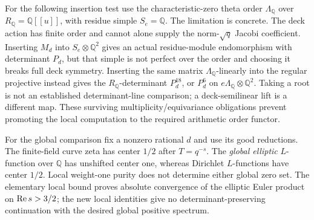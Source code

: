 For the following insertion test use the characteristic-zero theta order $\Lambda_{\mathbb{Q}}$ over $R_{\mathbb{Q}}=\mathbb{Q}[[u]]$, with residue simple $S_e=\mathbb{Q}$. The limitation is concrete. The deck action has finite order and cannot alone supply the norm-$\sqrt q$ Jacobi coefficient. Inserting $M_d$ into $S_e\otimes\mathbb{Q}^2$ gives an actual residue-module endomorphism with determinant $P_d$, but that simple is not perfect over the order and choosing it breaks full deck symmetry. Inserting the same matrix $\Lambda_{\mathbb{Q}}$-linearly into the regular projective instead gives the $R_{\mathbb{Q}}$-determinant $P_d^{18}$, or $P_d^6$ on $e\Lambda_{\mathbb{Q}}\otimes\mathbb{Q}^2$. Taking a root is not an established determinant-line comparison; a deck-semilinear lift is a different map. These surviving multiplicity/equivariance obligations prevent promoting the local computation to the required arithmetic order functor.

For the global comparison fix a nonzero rational $d$ and use its good reductions. The finite-field curve zeta has center $1/2$ after $T=q^{-s}$. The \emph{global elliptic} $L$-function over $\mathbb{Q}$ has unshifted center one, whereas Dirichlet $L$-functions have center $1/2$. Local weight-one purity does not determine either global zero set. The elementary local bound proves absolute convergence of the elliptic Euler product on $\operatorname{Re} s>3/2$; the new local identities give no determinant-preserving continuation with the desired global positive spectrum.


